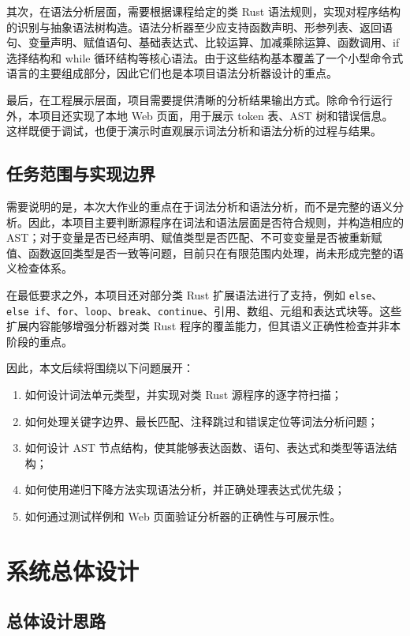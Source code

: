 \documentclass[UTF8,a4paper,12pt]{ctexart}
\begin{document}
其次，在语法分析层面，需要根据课程给定的类 Rust 语法规则，实现对程序结构的识别与抽象语法树构造。语法分析器至少应支持函数声明、形参列表、返回语句、变量声明、赋值语句、基础表达式、比较运算、加减乘除运算、函数调用、if 选择结构和 while 循环结构等核心语法。由于这些结构基本覆盖了一个小型命令式语言的主要组成部分，因此它们也是本项目语法分析器设计的重点。

最后，在工程展示层面，项目需要提供清晰的分析结果输出方式。除命令行运行外，本项目还实现了本地 Web 页面，用于展示 token 表、AST 树和错误信息。这样既便于调试，也便于演示时直观展示词法分析和语法分析的过程与结果。

\subsection{任务范围与实现边界}

需要说明的是，本次大作业的重点在于词法分析和语法分析，而不是完整的语义分析。因此，本项目主要判断源程序在词法和语法层面是否符合规则，并构造相应的 AST；对于变量是否已经声明、赋值类型是否匹配、不可变变量是否被重新赋值、函数返回类型是否一致等问题，目前只在有限范围内处理，尚未形成完整的语义检查体系。

在最低要求之外，本项目还对部分类 Rust 扩展语法进行了支持，例如 \texttt{else}、\texttt{else if}、\texttt{for}、\texttt{loop}、\texttt{break}、\texttt{continue}、引用、数组、元组和表达式块等。这些扩展内容能够增强分析器对类 Rust 程序的覆盖能力，但其语义正确性检查并非本阶段的重点。

因此，本文后续将围绕以下问题展开：

\begin{enumerate}[label=\arabic*.]
    \item 如何设计词法单元类型，并实现对类 Rust 源程序的逐字符扫描；
    \item 如何处理关键字边界、最长匹配、注释跳过和错误定位等词法分析问题；
    \item 如何设计 AST 节点结构，使其能够表达函数、语句、表达式和类型等语法结构；
    \item 如何使用递归下降方法实现语法分析，并正确处理表达式优先级；
    \item 如何通过测试样例和 Web 页面验证分析器的正确性与可展示性。
\end{enumerate}

\section{系统总体设计}

\subsection{总体设计思路}
\end{document}
